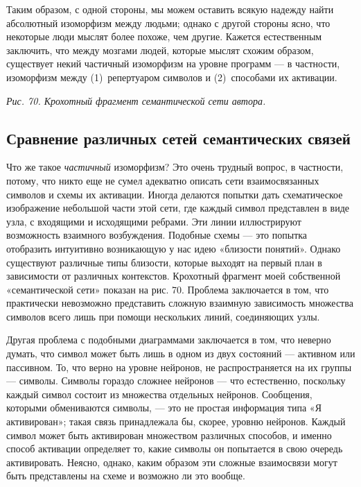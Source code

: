 \documentclass[../main.tex]{subfiles}
\begin{document}
Таким образом, с одной стороны, мы можем оставить всякую надежду найти абсолютный изоморфизм между людьми; однако с другой стороны ясно, что некоторые люди мыслят более похоже, чем другие. Кажется естественным заключить, что между мозгами людей, которые мыслят схожим образом, существует некий частичный изоморфизм на уровне программ --- в частности, изоморфизм между (1)~репертуаром символов и (2)~способами их активации.

\emph{Рис. 70. Крохотный фрагмент семантической сети автора.}


\subsection{Сравнение различных сетей семантических связей}

Что же такое \emph{частичный} изоморфизм? Это очень трудный вопрос, в частности, потому, что никто еще не сумел адекватно описать сети взаимосвязанных символов и схемы их активации. Иногда делаются попытки дать схематическое изображение небольшой части этой сети, где каждый символ представлен в виде узла, с входящими и исходящими ребрами. Эти линии иллюстрируют возможность взаимного возбуждения. Подобные схемы --- это попытка отобразить интуитивно возникающую у нас идею «близости понятий». Однако существуют различные типы близости, которые выходят на первый план в зависимости от различных контекстов. Крохотный фрагмент моей собственной «семантической сети» показан на рис. 70. Проблема заключается в том, что практически невозможно представить сложную взаимную зависимость множества символов всего лишь при помощи нескольких линий, соединяющих узлы.

Другая проблема с подобными диаграммами заключается в том, что неверно думать, что символ может быть лишь в одном из двух состояний --- активном или пассивном. То, что верно на уровне нейронов, не распространяется на их группы --- символы. Символы гораздо сложнее нейронов --- что естественно, поскольку каждый символ состоит из множества отдельных нейронов. Сообщения, которыми обмениваются символы, --- это не простая информация типа «Я активирован»; такая связь принадлежала бы, скорее, уровню нейронов. Каждый символ может быть активирован множеством различных способов, и именно способ активации определяет то, какие символы он попытается в свою очередь активировать. Неясно, однако, каким образом эти сложные взаимосвязи могут быть представлены на схеме и возможно ли это вообще.
\end{document}
